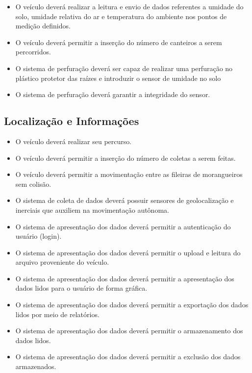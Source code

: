     \begin{itemize}
      \item O veículo deverá realizar a leitura e envio de dados referentes a umidade do solo, umidade relativa do ar e temperatura do ambiente nos pontos de medição definidos.
      \item O veículo deverá permitir a inserção do número de canteiros a serem percorridos.
      \item O sistema de perfuração deverá ser capaz de realizar uma perfuração no plástico protetor das raízes e introduzir o sensor de umidade no solo
      \item O sistema de perfuração deverá garantir a integridade do sensor.
    \end{itemize}

    \subsection{Localização e Informações}

      \begin{itemize}
        \item O veículo deverá realizar seu percurso.
        \item O veículo deverá permitir a inserção do número de coletas a serem feitas.
        \item O veículo deverá permitir a movimentação entre as fileiras de morangueiros sem colisão.
        \item O sistema de coleta de dados deverá possuir sensores de geolocalização e inerciais que auxiliem na movimentação autônoma.
        \item O sistema de apresentação dos dados deverá permitir a autenticação do usuário (login).
        \item O sistema de apresentação dos dados deverá permitir o upload e leitura do arquivo proveniente do veículo.
        \item O sistema de apresentação dos dados deverá permitir a apresentação dos dados lidos para o usuário de forma gráfica.
        \item O sistema de apresentação dos dados deverá permitir a exportação dos dados lidos por meio de relatórios.
        \item O sistema de apresentação dos dados deverá permitir o armazenamento dos dados lidos.
        \item O sistema de apresentação dos dados deverá permitir a exclusão dos dados armazenados.
      \end{itemize}
